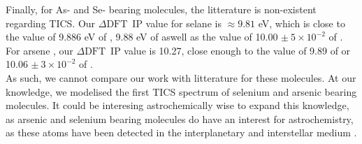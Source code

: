 \documentclass[article,preview]{planetary}
\newcommand{\dft}{\ensuremath{\Delta\textrm{DFT}}}
\newcommand{\sn}[2]{\ensuremath{#1\times 10^{#2}}}
\begin{document}
Finally, for As- and Se- bearing molecules, the litterature is non-existent regarding TICS. Our \dft~IP value for selane  is $\approx 9.81$ eV, which is close to the value of  9.886 eV of \textcite{gibsonPhotoionizationStudySeH1986}, 9.88 eV of \textcite{pottsPhotoelectronSpectraValence1972} aswell as the value of 10.00 $\pm~\sn{5}{-2}$ of \textcite{balkisIonisationHydrogenSulphide1976}. For arsene , our \dft~IP value is 10.27, close enough to the value of 9.89 of \textcite{pottsPhotoelectronSpectraValence1972} or 10.06 $\pm~\sn{3}{-2}$ of \textcite{brantonPhotoelectronSpectraPhosphine1970}.\\
As such, we cannot compare our work with litterature for these molecules. At our knowledge, we modelised the first TICS spectrum of selenium and arsenic bearing molecules. It could be interesing astrochemically wise to expand this knowledge, as arsenic and selenium bearing molecules do  have an interest for astrochemistry, as these atoms have been detected in the interplanetary and interstellar medium \parencite{bezardDetectionArsineSaturn1989,roedererDETECTIONELEMENTSALL2012,varas-reusSeleniumIsotopesTracers2019,cardelliAbundanceHeavyElements1994,cardelliUltravioletTransitionsLow1993,roedererGERMANIUMARSENICSELENIUM2012}.

\end{document}
